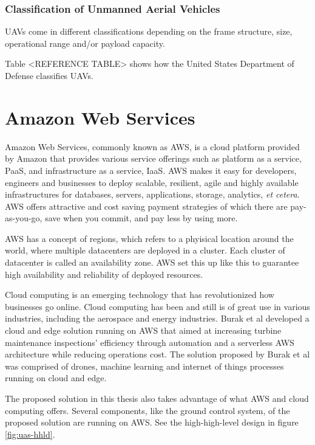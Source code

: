 \subsubsection{Classification of Unmanned Aerial Vehicles}
UAVs come in different classifications depending on the frame structure, size, operational range and/or payload capacity.

Table <REFERENCE TABLE> shows how the United States Department of Defense classifies UAVs.


\section{Amazon Web Services}
Amazon Web Services, commonly known as AWS, is a cloud platform provided by Amazon that provides various service offerings such as platform as a service, PaaS, and infrastructure as a service, IaaS\cite{awswhatisaws2022}. AWS makes it easy for developers, engineers and businesses to deploy scalable, resilient, agile and highly available infrastructures for databases, servers, applications, storage, analytics, \textit{et cetera}. AWS offers attractive and cost saving payment strategies of which there are pay-as-you-go, save when you commit, and pay less by using more\cite{awspricing2022}.

AWS has a concept of regions, which refers to a phyisical location around the world, where multiple datacenters are deployed in a cluster. Each cluster of datacenter is called an availability zone\cite{awsregionsandazs}. AWS set this up like this to guarantee high availability and reliability of deployed resources.

Cloud computing is an emerging technology that has revolutionized how businesses go online. Cloud computing has been and still is of great use in various industries, including the aerospace and energy industries. Burak et al developed a cloud and edge solution running on AWS that aimed at increasing turbine maintenance inspections' efficiency through automation and a serverless AWS architecture while reducing operations cost\cite{burakawswindfarm2021}. The solution proposed by Burak et al was comprised of drones, machine learning and internet of things processes running on cloud and edge.

The proposed solution in this thesis also takes advantage of what AWS and cloud computing offers. Several components, like the ground control system, of the proposed solution are running on AWS. See the high-high-level design in figure \ref{fig:uas-hhld}.

